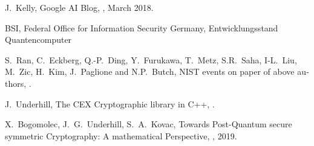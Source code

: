 \documentclass[a4paper,11pt]{article}
\begin{document}
\begin{otherlanguage}{english}
\begin{thebibliography}{1}
  J.~Kelly,
  \newblock Google AI Blog,
  , March 2018.

BSI, Federal Office for Information Security Germany,
  \newblock Entwicklungsstand Quantencomputer

  S.~Ran, C.~Eckberg, Q.-P.~Ding, Y.~Furukawa, T.~Metz, S.R.~Saha, I-L.~Liu, M.~Zic, H.~Kim, J.~Paglione and N.P.~Butch,
  \newblock NIST events on paper of above authors,
  .

J.~Underhill,
  \newblock The CEX Cryptographic library in C++,
  .

X.~Bogomolec, J.~G.~Underhill, S.~A.~Kovac,
  \newblock Towards Post-Quantum secure symmetric Cryptography: 
A mathematical Perspective,  
  , 2019.


  
\end{thebibliography}



\end{otherlanguage}
\end{document}
